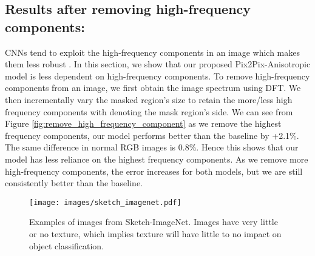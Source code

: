 \documentclass{bmvc2k}
\begin{document}
\subsection{Results after removing high-frequency components:}
CNNs tend to exploit the high-frequency components in an image which makes them less robust \cite{wang2020high,ilyas2019adversarial}. In this section, we show that our proposed Pix2Pix-Anisotropic model is less dependent on high-frequency components. To remove high-frequency components from an image, we first obtain the image spectrum using DFT. 
We then incrementally vary the masked region's size to retain the more/less high frequency components with  denoting the mask region's side.
We can see from  Figure \ref{fig:remove_high_frequency_component} as we remove the highest frequency components, our model performs better than the baseline by +2.1\%. The same difference in normal RGB images is 0.8\%. Hence this shows that our model has less reliance on the highest frequency components.
As we remove more high-frequency components, the error increases for both models, but we are still consistently better than the baseline.





















\begin{figure*}[t!]
    \centering
    \texttt{[image: images/sketch\_imagenet.pdf]}
\caption{Examples of images from Sketch-ImageNet. Images have very little or no texture, which implies texture will have little to no impact on object classification.}
\label{fig:sketch_images}
\end{figure*}
\end{document}
